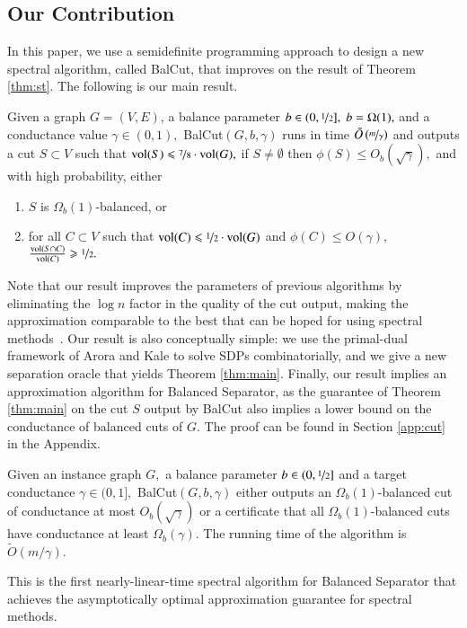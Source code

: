 \documentclass[twoside,leqno,twocolumn]{article}
\newcommand{\nfrac}{\nicefrac}
\renewcommand{\leq}{\leqslant}
\renewcommand{\geq}{\geqslant}
\newcommand{\vol}{\mathrm{vol}}
\newcommand{\BS}{{\sc Balanced Separator}\xspace}
\newcommand{\SDP}{{\sf SDP}\xspace}
\numberwithin{equation}{section}
\newcommand{\alg}{{\sc BalCut}\xspace}
\begin{document}
\subsection{Our Contribution}


In this paper,  we use a semidefinite programming approach to design a new spectral algorithm, called {\sc BalCut}, that improves on the result of Theorem \ref{thm:st}. The following is our main result. 


\begin{theorem} \label{thm:main}
Given a graph  $G=(V,E)$, a balance parameter $b \in (0,\nfrac{1}{2}], \; b = \Omega(1),$ and a conductance value $\gamma \in (0,1),$ {\sc BalCut}$(G,b, \gamma)$ runs in time $\tilde{O}\left(\nfrac{m}{\gamma}\right)$ and outputs a cut $S \subset V$  such that $\vol(S) \leq \nfrac{7}{8}\cdot \vol(G),$  if $S \neq \emptyset$ then  $\phi(S) \leq O_b\left(\sqrt{\gamma}\right),$ and with high probability, either
\begin{enumerate}
\item $S$ is $\Omega_b(1)$-balanced, or 
\item for all $C \subset V$ such that $\vol(C) \leq \nfrac{1}{2} \cdot \vol(G) $ and  $\phi(C) \leq O(\gamma),$ 
$
\frac{\vol(S \cap C)}{\vol(C)} \geq \nfrac{1}{2}.
$
\end{enumerate} 
\end{theorem}


\noindent
Note that our result improves the parameters  of previous algorithms by eliminating the $\log n$ factor in the quality of the cut output, making the approximation comparable to the best that can be hoped for using spectral methods~\cite{GM}. Our result is also conceptually simple: we use the primal-dual framework of Arora and Kale \cite{AK} to solve {\SDP}s combinatorially, and we give a new separation oracle that yields  Theorem \ref{thm:main}.
Finally, our result implies an approximation algorithm for {\BS}, as the guarantee of Theorem \ref{thm:main} on the cut $S$ output by \alg also implies a lower bound on the conductance of balanced cuts of $G.$ The proof can be found in Section \ref{app:cut} in the Appendix.
\begin{corollary}\label{cor:cut}
Given an instance graph $G,$ a balance parameter $b \in (0, \nfrac{1}{2}]$ and a target conductance $\gamma \in (0,1],$ \alg$(G,b,\gamma)$ either outputs an $\Omega_b(1)$-balanced cut of conductance at most $O_b(\sqrt{\gamma})$ or a certificate that all $\Omega_b(1)$-balanced cuts have conductance at least $\Omega_b(\gamma).$ The running time of the algorithm is $\tilde{O}(m/{\gamma}).$
\end{corollary}
This is the first nearly-linear-time spectral algorithm for \BS that achieves the asymptotically optimal approximation guarantee for spectral methods.
\end{document}
